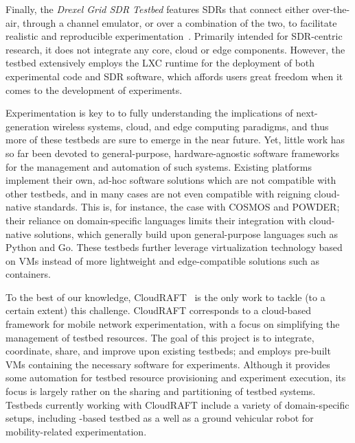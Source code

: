 Finally, the \emph{Drexel Grid \gls{SDR} Testbed} features \glspl{SDR} that connect either over-the-air, through a channel emulator, or over a combination of the two, to facilitate realistic and reproducible experimentation~\cite{DrexelGrid}.
Primarily intended for \gls{SDR}-centric research, it does not integrate any core, cloud or edge components.
However, the testbed extensively employs the \gls{LXC} runtime for the deployment of both experimental code and \gls{SDR} software, which affords users great freedom when it comes to the development of experiments.

Experimentation is key to to fully understanding the implications of next-generation wireless systems, cloud, and edge computing paradigms, and thus more of these testbeds are sure to emerge in the near future.
Yet, little work has so far been devoted to general-purpose, hardware-agnostic software frameworks for the management and automation of such systems.
Existing platforms implement their own, ad-hoc software solutions which are not compatible with other testbeds, and in many cases are not even compatible with reigning cloud-native standards.
This is, for instance, the case with \gls{COSMOS} and \gls{POWDER}; their reliance on domain-specific languages limits their integration with cloud-native solutions, which generally build upon general-purpose languages such as Python and Go.
These testbeds further leverage virtualization technology based on \glspl{VM} instead of more lightweight and edge-compatible solutions such as containers.

To the best of our knowledge, CloudRAFT~\cite{cloudraft} is the only work to tackle (to a certain extent) this challenge.
CloudRAFT corresponds to a cloud-based framework for mobile network experimentation, with a focus on simplifying the management of testbed resources.
The goal of this project is to integrate, coordinate, share, and improve upon existing testbeds; and employs pre-built \glspl{VM} containing the necessary software for experiments.
Although it provides some automation for testbed resource provisioning and experiment execution, its focus is largely rather on the sharing and partitioning of testbed systems.
Testbeds currently working with CloudRAFT include a variety of domain-specific setups, including -based testbed as a well as a ground vehicular robot for mobility-related experimentation.
